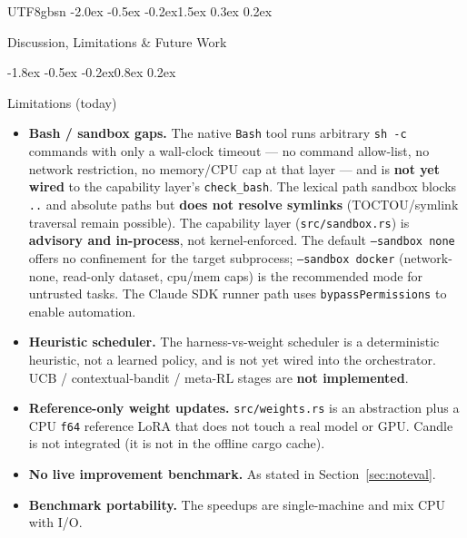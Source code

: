 \documentclass{article}
\makeatletter
\renewcommand{\section}{\@startsection{section}{1}{\z@}%
  {-2.0ex \@plus -0.5ex \@minus -0.2ex}{1.5ex \@plus 0.3ex \@minus 0.2ex}%
  {\large\bfseries\raggedright\color{accent}}}
\renewcommand{\subsection}{\@startsection{subsection}{2}{\z@}%
  {-1.8ex \@plus -0.5ex \@minus -0.2ex}{0.8ex \@plus 0.2ex}%
  {\normalsize\bfseries\raggedright\color{accent}}}
\makeatother
\begin{document}
\begin{CJK}{UTF8}{gbsn}
\section{Discussion, Limitations \& Future Work}

\subsection{Limitations (today)}
\label{sec:limitations}
\begin{itemize}
\item \textbf{Bash / sandbox gaps.} The native \texttt{Bash} tool runs arbitrary
  \texttt{sh -c} commands with only a wall-clock timeout --- no command allow-list,
  no network restriction, no memory/CPU cap at that layer --- and is \textbf{not yet
  wired} to the capability layer's \texttt{check\_bash}. The lexical path sandbox
  blocks \texttt{..} and absolute paths but \textbf{does not resolve symlinks}
  (TOCTOU/symlink traversal remain possible). The capability layer
  (\texttt{src/sandbox.rs}) is \textbf{advisory and in-process}, not kernel-enforced.
  The default \texttt{--sandbox none} offers no confinement for the target
  subprocess; \texttt{--sandbox docker} (network-none, read-only dataset, cpu/mem
  caps) is the recommended mode for untrusted tasks. The Claude SDK runner path uses
  \texttt{bypassPermissions} to enable automation.
\item \textbf{Heuristic scheduler.} The harness-vs-weight scheduler is a
  deterministic heuristic, not a learned policy, and is not yet wired into the
  orchestrator. UCB / contextual-bandit / meta-RL stages are \textbf{not
  implemented}.
\item \textbf{Reference-only weight updates.} \texttt{src/weights.rs} is an
  abstraction plus a CPU \texttt{f64} reference LoRA that does not touch a real model
  or GPU. Candle is not integrated (it is not in the offline cargo cache).
\item \textbf{No live improvement benchmark.} As stated in
  Section~\ref{sec:noteval}.
\item \textbf{Benchmark portability.} The speedups are single-machine and mix CPU
  with I/O.
\end{itemize}


\end{CJK}
\end{document}

